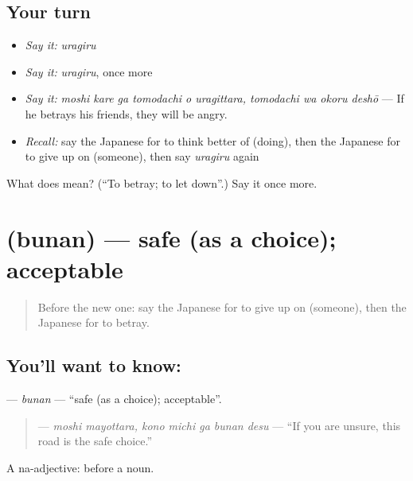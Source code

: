 \subsection*{Your turn}
\begin{itemize}
\raggedright
  \item \emph{Say it:} \emph{uragiru}
  \item \emph{Say it:} \emph{uragiru}, once more
  \item \emph{Say it:} \emph{moshi kare ga tomodachi o uragittara, tomodachi wa okoru deshō} — If he betrays his friends, they will be angry.
  \item \emph{Recall:} say the Japanese for to think better of (doing), then the Japanese for to give up on (someone), then say \emph{uragiru} again
\end{itemize}

\begin{tcolorbox}[breakable,colback=teal!4,colframe=teal!35!black,title={Before you move on}]
What does  mean? (\textquotedblleft{}To betray; to let down\textquotedblright{}.) Say it once more.
\end{tcolorbox}
\section[\texorpdfstring{\ja{ぶなん} (bunan)}{ぶなん (bunan)}]{ (bunan) — safe (as a choice); acceptable}

\label{lesson:JA-C519-bunan}



\begin{quote}
Before the new one: say the Japanese for to give up on (someone), then the Japanese for to betray.
\end{quote}

\subsection*{You'll want to know: }
\textbf{} — \emph{bunan} — \textquotedblleft{}safe (as a choice); acceptable\textquotedblright{}.

\begin{quote}
\textbf{   } — \emph{moshi mayottara, kono michi ga bunan desu} — \textquotedblleft{}If you are unsure, this road is the safe choice.\textquotedblright{}
\end{quote}

A na-adjective:  before a noun.

